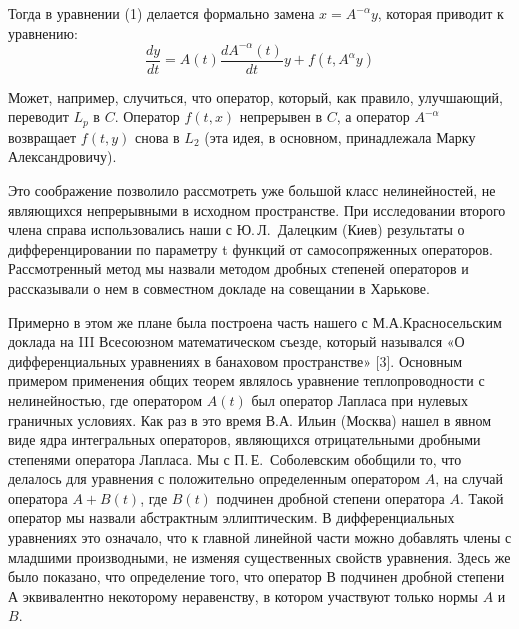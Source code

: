 Тогда в уравнении (1) делается формально замена \linebreak $x = A^{-\alpha} y$, которая приводит к уравнению:
\begin{equation}
\frac{dy}{dt} = A(t)\frac{d A^{-\alpha} (t)}{dt} y + f(t, A^{\alpha} y)
\end{equation}

Может, например, случиться, что оператор, который, как правило, улучшающий, переводит $L_p$ в $C$. Оператор $f(t,x)$ непрерывен в $C$, а оператор $A^{-\alpha}$  возвращает $f(t, y)$ снова в $L_2$ (эта идея, в основном, принадлежала Марку Александровичу).

Это соображение позволило рассмотреть уже большой класс нелинейностей,
не являющихся непрерывными в исходном пространстве.
При исследовании второго члена
\linebreak
справа использовались наши с Ю.\,Л.~Далецким (Киев) результаты о дифференцировании по параметру t функций от самосопряженных операторов. Рассмотренный метод мы назвали методом дробных степеней операторов и рассказывали о нем в совместном докладе на совещании в Харькове.

Примерно в этом же плане была построена часть нашего с М.А.Красносельским доклада на III Всесоюзном математическом съезде, который назывался «О дифференциальных уравнениях в банаховом пространстве» [3]. Основным примером применения общих теорем являлось уравнение теплопроводности с нелинейностью, где оператором $A(t)$ был оператор Лапласа при нулевых граничных условиях. Как раз в это время В.А. Ильин (Москва) нашел в явном виде ядра интегральных операторов, являющихся отрицательными дробными степенями оператора Лапласа.
Мы с П.\,Е.~Соболевским обобщили то, что делалось для уравнения с положительно определенным оператором $A$, на случай оператора $A+B(t)$, где $B(t)$ подчинен дробной степени оператора $A$. Такой оператор мы назвали абстрактным эллиптическим. В дифференциальных уравнениях это означало, что к главной линейной части можно добавлять члены с младшими производными, не изменяя существенных свойств уравнения. Здесь же было показано, что определение того, что оператор $В$ подчинен дробной степени $А$ эквивалентно некоторому неравенству, в котором участвуют только нормы $A$ и $B$.

